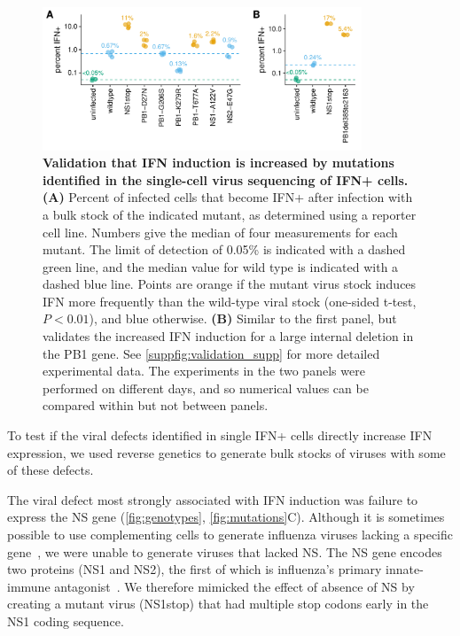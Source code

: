 \documentclass[10pt,letterpaper]{article}
\newcommand{\FIG}[1]{\autoref{fig:#1}}
\newcommand{\SUPPFIG}[1]{\autoref{suppfig:#1}}
\begin{document}
\begin{figure}

\centerline{\includegraphics[width=0.85\textwidth]{figures/Validation_Figure/ifn_plot.pdf}}
\caption{
{\bf Validation that IFN induction is increased by mutations identified in the single-cell virus sequencing of IFN+ cells.}
{\bf (A)}
Percent of infected cells that become IFN+ after infection with a bulk stock of the indicated mutant, as determined using a reporter cell line.
Numbers give the median of four measurements for each mutant.
The limit of detection of 0.05\% is indicated with a dashed green line, and the median value for wild type is indicated with a dashed blue line.
Points are orange if the mutant virus stock induces IFN more frequently than the wild-type viral stock (one-sided t-test, $P < 0.01$), and blue otherwise.
{\bf (B)}
Similar to the first panel, but validates the increased IFN induction for a large internal deletion in the PB1 gene.
See \SUPPFIG{validation_supp} for more detailed experimental data.
The experiments in the two panels were performed on different days, and so numerical values can be compared within but not between panels.
}
\label{fig:validation}

\end{figure}

To test if the viral defects identified in single IFN+ cells directly increase IFN expression, we used reverse genetics to generate bulk stocks of viruses with some of these defects.

The viral defect most strongly associated with IFN induction was failure to express the NS gene (\FIG{genotypes}, \FIG{mutations}C).
Although it is sometimes possible to use complementing cells to generate influenza viruses lacking a specific gene~\citep{fujii2003selective,marsh2007specific}, we were unable to generate viruses that lacked NS.
The NS gene encodes two proteins (NS1 and NS2), the first of which is influenza's primary innate-immune antagonist~\citep{garcia1998influenza, hale2008multifunctional}.
We therefore mimicked the effect of absence of NS by creating a mutant virus (NS1stop) that had multiple stop codons early in the NS1 coding sequence.
\end{document}
